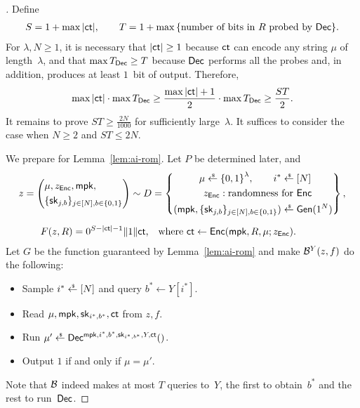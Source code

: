 \begin{proof}[]
Define
\begin{align*}
S=1+\max{|\ct|},\qquad
T=1+\max{\{\textup{number of bits in $R$ probed by $\Dec$}\}}.
\end{align*}
For ${\lambda,N\geq 1}$, it is necessary
that ${|\ct|\geq 1}$ because $\ct$ can encode any string $\mu$ of length~$\lambda$, and
that ${\max{\TDec}\geq T}$ because $\Dec$ performs all the probes and, in addition, produces at least $1$~bit of output.
Therefore,
\begin{align*}
\max{|\ct|}\cdot\max{\TDec}
\geq\frac{\max{|\ct|}+1}{2}\cdot\max{\TDec}
\geq\frac{ST}{2}.
\end{align*}
It remains to prove ${ST\geq\frac{2N}{1000}}$ for sufficiently large~$\lambda$.
It suffices to consider the case when ${N\geq 2}$ and ${ST\leq 2N}$.

We prepare for Lemma~\ref{lem:ai-rom}.
Let $P$ be determined later, and
\begin{align*}
z&{}=\left(\begin{aligned}
&\mu,z_\Enc,\mpk,\\
&\{\sk_{j,b}\}_{j\in[N],b\in\bit}
\end{aligned}\right)\sim D=
\left\{\begin{aligned}
\mu\draws\bit^\lambda,\qquad
i^\ast\draws{}&[N]\\
z_\Enc:\textup{randomness for }&\Enc\\
(\mpk,\{\sk_{j,b}\}_{j\in[N],b\in\bit})\draws{}&\Gen(1^N)
\end{aligned}\right\},\\
\rule[1.5em]{0pt}{0pt}
F(z,R)
\hspace*{-5em}&\hspace*{5em}
{}=0^{S-|\ct|-1}\concat 1\concat\ct\textup{,\quad where }
\ct\gets\Enc(\mpk,R,\mu;z_\Enc).
\end{align*}
Let $G$ be the function guaranteed by Lemma~\ref{lem:ai-rom} and make
${\mathcal{B}}^Y(z,f)$ do the following:
\begin{itemize}
\item Sample ${i^\ast\draws[N]}$ and query ${b^\ast\gets Y[i^\ast]}$.
\item Read $\mu,\mpk,\sk_{i^\ast,b^\ast},\ct$ from $z,f$.
\item Run ${\mu'\draws\Dec^{\mpk,i^\ast,b^\ast,\sk_{i^\ast,b^\ast},Y,\ct}()}$.
\item Output $1$ if and only if ${\mu=\mu'}$.
\end{itemize}
Note that ${\mathcal{B}}$ indeed makes at most $T$ queries to~$Y$,
the first to obtain~$b^\ast$ and the rest to run~$\Dec$.


\end{proof}
